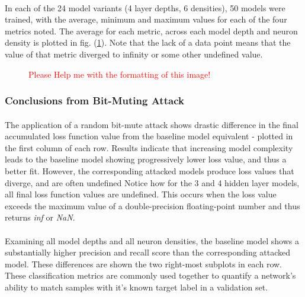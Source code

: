 \documentclass[12pt,letterpaper]{article}
\begin{document}
\paragraph*{}In each of the 24 model variants (4 layer depths, 6 densities), 50 models were trained, with the average, minimum and maximum values for each of the four metrics noted. The average for each metric, across each model depth and neuron density is plotted in fig. (\ref{results}). Note that the lack of a data point means that the value of that metric diverged to infinity or some other undefined value.

\begin{figure}[h]
	\centering
	\textcolor{red}{Please Help me with the formatting of this image!}
	\label{results}
\end{figure}

\subsubsection{Conclusions from Bit-Muting Attack}

\paragraph*{}The application of a random bit-mute attack shows drastic difference in the final accumulated loss function value from the baseline model equivalent - plotted in the first column of each row. Results indicate that increasing model complexity leads to the baseline model showing progressively lower loss value, and thus a better fit. However, the corresponding attacked models produce loss values that diverge, and are often undefined Notice how for the 3 and 4 hidden layer models, all final loss function values are undefined. This occurs when the loss value exceeds the maximum value of a double-precision floating-point number and thus returns \textit{inf} or \textit{NaN}. 

\paragraph*{}Examining all model depths and all neuron densities, the baseline model shows a substantially higher precision and recall score than the corresponding attacked model. These differences are shown the two right-most subplots in each row. These classification metrics are commonly used together to quantify a network's ability to match samples with it's known target label in a validation set. 
\end{document}
